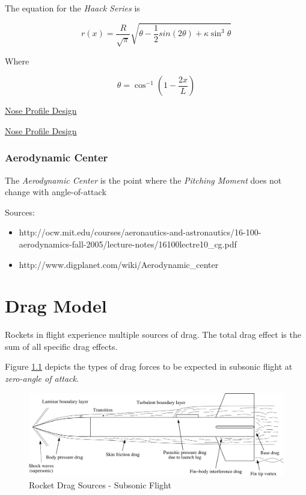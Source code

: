 \documentclass[]{book}
\providecommand{\tightlist}{%
  \setlength{\itemsep}{0pt}\setlength{\parskip}{0pt}}
\begin{document}
The equation for the \emph{Haack Series} is

\begin{equation}
r(x) = \dfrac{R}{\sqrt{\pi}} \sqrt{ \theta - \dfrac{1}{2} sin (2 \theta) + \kappa \sin^3 \theta }
\end{equation}

Where

\begin{equation}
\theta = \cos^{-1} \left( 1 - \dfrac{2x}{L} \right)
\end{equation}

\href{http://rimworld.com/nassarocketry/fabrication/nosecones/design.html}{Nose
Profile Design}

\href{https://en.wikipedia.org/wiki/Nose_cone_design\#Von_K.C3.A1rm.C3.A1n}{Nose
Profile Design}

\subsection{Aerodynamic Center}\label{aerodynamic-center}

The \emph{Aerodynamic Center} is the point where the \emph{Pitching
Moment} does not change with angle-of-attack

Sources:

\begin{itemize}
\tightlist
\item
  http://ocw.mit.edu/courses/aeronautics-and-astronautics/16-100-aerodynamics-fall-2005/lecture-notes/16100lectre10\_cg.pdf
\item
  http://www.digplanet.com/wiki/Aerodynamic\_center
\end{itemize}

\chapter{Drag Model}\label{drag-model}

Rockets in flight experience multiple sources of drag. The total drag
effect is the sum of all specific drag effects.

Figure \ref{rocket_drag_sources_label} depicts the types of drag forces
to be expected in subsonic flight at \emph{zero-angle of attack}.

\begin{figure}[htbp]
\centering
\includegraphics{images/drag_sources_niskanen2013.png}
\caption{Rocket Drag Sources - Subsonic Flight
\label{rocket_drag_sources_label}}
\end{figure}
\end{document}
